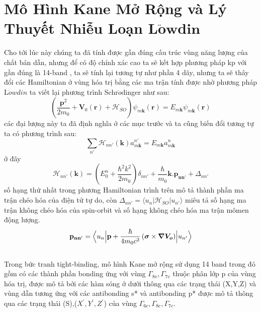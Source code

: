\chapter{\bfseries Mô Hình Kane Mở Rộng và Lý Thuyết Nhiễu Loạn $\mathbf{L\ddot{o}wdin}$}
\label{Chapter3} %
Cho tới lúc này chúng ta đã tính được gần đúng cấu trúc vùng năng lượng của chất bán dẫn, nhưng để có độ chính xác cao  ta sẽ kết hợp phương pháp kp với gần đúng là 14-band , ta sẽ tính lại tương tự như phần 4 dãy, nhưng ta sẽ thây đổi các Hamiltonian ở vùng hóa trị bằng các ma trận tính được nhờ phương pháp L$\ddot{o}wdin$ 
ta viết lại phương trình Schr$\ddot{o}$dinger như sau:
\begin{equation}
\left(\frac{\mathbf{p}^2}{2m_0} +\mathbf{V}_0\left(\mathbf{r}\right) + \mathcal{H}_{SO}\right)\psi_{m\mathbf{k}}\left(\mathbf{r}\right) = E_{m\mathbf{k}}\psi_{m\mathbf{k}}\left(\mathbf{r}\right)
\end{equation}
các đại lượng này ta đã định nghĩa ở các mục trước và ta cũng biến đổi tương tự ta có phương trình sau:
\begin{equation}
\sum_{n'}\mathcal{H}_{nn'}\left(\mathbf{k}\right) a_{m\mathbf{k}}^{n'} = E_{m\mathbf{k}}a_{m\mathbf{k}}^n
\end{equation} 
 ở đây 
\begin{equation}
\mathcal{H}_{nn'}\left(\mathbf{k}\right) = \left(E_0^n +\frac{\hbar^2 k^2}{2m_0}\right)\delta_{nn'} + \frac{\hbar}{m_0}\mathbf{k.p_{nn'}} + \Delta_{nn'}
\end{equation} 
số hạng thứ nhất trong phương Hamiltonian trình trên mô tả thành phần ma trận chéo hóa của điện tử tự do, còn $\Delta_{nn'}=\langle u_n|\mathcal{H}_{SO}|u_{n'}\rangle$ miêu tả số hạng ma trận không chéo hóa của spin-orbit và số hạng không chéo hóa ma trận mômen động lượng.
\begin{equation}
\mathbf{p_{nn'}}=\Bigl\langle u_n\Bigl\vert \mathbf{p}+\frac{\hbar}{4m_0c^2}\left(\boldsymbol{\sigma}\times\boldsymbol{\nabla V_o}\right)\Bigr \vert u_{n'}\Bigr\rangle
\end{equation}\\
Trong bức tranh tight-binding, mô hình Kane mở rộng sử dụng 14 band trong đó gồm có các thành phần bonding ứng với vùng $\Gamma_{8v},\Gamma_{7v}$ thuộc phân lớp p của vùng hóa trị, được mô tả bởi các hàm sóng ở dưới thông qua các trạng thái (X,Y,Z) và vùng dẫn tương ứng với các  antibonding s* và antibonding p* được mô tả thông qua các trạng thái (S),($X^{'},Y^{'},Z^{'}$) của vùng $\Gamma_{6c},\Gamma_{8c},\Gamma_{7c}$.


